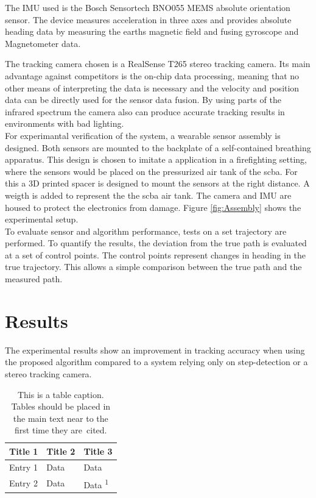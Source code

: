 \documentclass[engproc,conferenceproceedings,submit,pdftex,moreauthors]{Definitions/mdpi}
\begin{document}
The IMU used  is the Bosch Sensortech BNO055 MEMS absolute orientation sensor. The device measures acceleration in three axes and provides absolute heading data by measuring the earths magnetic field and fusing gyroscope and Magnetometer data. 
  
The tracking camera chosen is a RealSense T265 stereo tracking camera. Its main advantage against competitors is the on-chip data processing, meaning that no other means of interpreting the data is necessary and the velocity and position data can be directly used for the sensor data fusion. By using parts of the infrared spectrum the camera also can produce accurate tracking results in environments with bad lighting.\\
  
For experimantal verification of the system, a wearable sensor assembly is designed. Both sensors are mounted to the backplate of a self-contained breathing apparatus. This design is chosen to imitate a application in a firefighting setting, where the sensors would be placed on the pressurized air tank of the scba. For this a 3D printed spacer is designed to mount the sensors at the right distance. A weigth is added to represent the the scba air tank. The camera and IMU are housed to protect the electronics from damage.  Figure \ref{fig:Assembly} shows the experimental setup.\\


To evaluate sensor and algorithm performance, tests on a set trajectory are performed. To quantify the results, the deviation from the true path is evaluated at a set of control points. The control points represent changes in heading in the true trajectory. This allows a simple comparison between the true path and the measured path. 
\section{Results}
The experimental results show an improvement in tracking accuracy when using the proposed algorithm compared to a system relying only on step-detection or a stereo tracking camera. 


\begin{table}[H] 
\caption{This is a table caption. Tables should be placed in the main text near to the first time they are~cited.\label{tab1}}
\begin{tabularx}{\textwidth}{CCC}
\toprule
\textbf{Title 1}	& \textbf{Title 2}	& \textbf{Title 3}\\
\midrule
Entry 1		& Data			& Data\\
Entry 2		& Data			& Data \textsuperscript{1}\\
\bottomrule
\end{tabularx}
\end{table}
\end{document}
